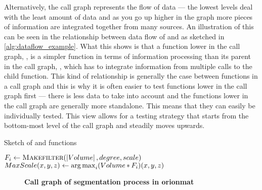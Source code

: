 Alternatively, the call graph represents the flow of data --- the lowest levels
deal with the least amount of data and as you go up higher in the graph more
pieces of information are integrated together from many sources.
An illustration of this can be seen in the relationship between 
data flow of  and
 as sketched in
\cref{alg:dataflow_example}. What this shows is that a function
lower in the call graph, , is a simpler function in terms of
information processing than its parent in the call graph,
, which has to integrate
information from multiple calls to the 
child function. This kind of relationship is generally the case
between functions in a call graph and this is why it
is often easier to test functions lower in the call graph first
--- there is less data to take into account and the functions
lower in the call graph are generally more standalone. This means
that they can easily be individually tested. This view allows for
a testing strategy that starts from the bottom-most level of the
call graph and steadily moves upwards.
\begin{algorithm}
	\caption{Sketch of  and
		 functions
	}\label{alg:dataflow_example}
	\begin{algorithmic}[1]
			\State {} 
		\EndFunction

				\State \(F_i \gets \Call{Makefilter}{\Dim{Volume}, degree, scale}\)
			\EndFor
			\State \(MaxScale(x,y,z) \gets \operatorname*{arg\,max}_{i} (Volume \mathop{\ast} F_i)(x,y,z)\)
		\EndFunction
	\end{algorithmic}
\end{algorithm}

\begin{figure}
\centering
\resizebox{1.0\textwidth}{!}{}
\caption[Call graph of segmentation process in ]{
\textbf{\boldmath{} Call graph of segmentation process in \gls{orionmat}}
}\label{fig:orionmat-segmentation}
\end{figure}

